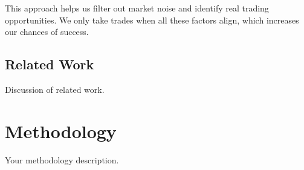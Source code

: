 \documentclass[12pt]{article}
\begin{document}
This approach helps us filter out market noise and identify real trading opportunities. We only take trades when all these factors align, which increases our chances of success.





















\newpage
\subsection{Related Work}
Discussion of related work.


\newpage
\section{Methodology}
Your methodology description.



\newpage
\end{document}
